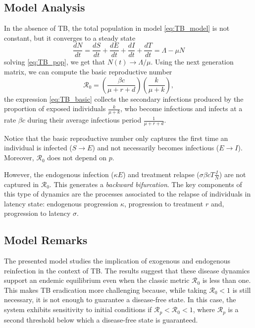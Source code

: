 \documentclass{book}
\begin{document}
\subsection*{Model Analysis}
In the absence of TB, the total population in model \eqref{eq:TB_model} is not constant, but it converges to a steady state
\begin{equation} \label{eq:TB_pop}
\frac{dN}{dt}=\frac{dS}{dt}+\frac{dE}{dt}+\frac{dI}{dt}+\frac{dT}{dt}=\Lambda-\mu N
\end{equation}
solving \eqref{eq:TB_pop}, we get that $N(t)\rightarrow \Lambda/\mu$. Using the next generation matrix, we can compute the basic reproductive number
\begin{equation}\label{eq:TB_basic}
\mathcal{R}_0= \left(\frac{\beta c}{\mu+r+d}\right)\left(\frac{k}{\mu+k}\right),
\end{equation}
the expression \eqref{eq:TB_basic} collects the secondary infections produced by the proportion of exposed individuals $\frac{k}{\mu+k}$, who become infectious and infects  at a rate $\beta c$ during their average infectious period $\frac{1}{\mu+r+d}$.

Notice that the basic reproductive number only captures the first time an individual is infected ($S\rightarrow E$) and not necessarily becomes infectious ($E\rightarrow I$). Moreover, $\mathcal{R}_0$ does not depend on $p$.

However, the endogenous infection ($\kappa E$) and treatment relapse ($\sigma \beta c T \frac{I}{N}$) are not captured in $\mathcal{R}_0$. This generates a {\it backward bifurcation}.
%
The key components of this type of dynamics are the processes associated to the relapse of individuals in latency state: endogenous progression $\kappa$, progression to treatment $r$ and, progression to latency $\sigma$.

\subsection*{Model Remarks}
The presented model studies the implication of exogenous and endogenous reinfection in the context of TB. The results suggest that these disease dynamics support an endemic equilibrium even when the classic metric $\mathcal{R}_0$ is less than one. This makes TB eradication more challenging because, while taking $\mathcal{R}_0<1$ is still necessary, it is not enough to guarantee a disease-free state. In this case, the system exhibits sensitivity to initial conditions if $\mathcal{R}_p<\mathcal{R}_0<1$, where $\mathcal{R}_p$ is a second threshold below which a disease-free state is guaranteed.
\end{document}
